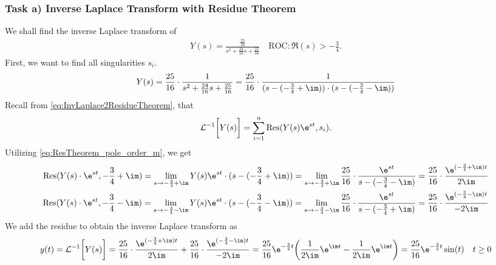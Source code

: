 \subsubsection{Task a) Inverse Laplace Transform with Residue Theorem}
We shall find the inverse Laplace transform of
\begin{align}
	Y(s)=\frac{\frac{25}{16}}{s^2+\frac{24}{16}s+\frac{25}{16}}
\quad \text{ROC}: \Re(s) > -\frac{3}{4}
	. \nonumber
\end{align}
First, we want to find all singularities $s_i$.
\begin{align}
	Y(s)=\frac{25}{16}\cdot\frac{1}{s^2+\frac{24}{16}s+\frac{25}{16}}=\frac{25}{16}\cdot \frac{1}{(s-(-\frac{3}{4}+\im))\cdot(s-(-\frac{3}{4}-\im))}
\end{align}
Recall from \eqref{eq:InvLaplace2ResidueTheorem}, that
\begin{align}
	\mathcal{L}^{-1}\bigg [Y(s)\bigg ] = \sum_{i=1}^{n}\mathrm{Res}(Y(s)\e^{st},s_i). \nonumber
\end{align}
Utilizing \eqref{eq:ResTheorem_pole_order_m}, we get
\begin{align}
	\mathrm{Res}(Y(s)\cdot\e^{st},-\frac{3}{4}+\im)=\lim\limits_{s\rightarrow-\frac{3}{4}+\im}Y(s)\e^{st}\cdot(s-(-\frac{3}{4}+\im))=\lim\limits_{s\rightarrow-\frac{3}{4}+\im}\frac{25}{16}\cdot\frac{\e^{st}}{s-(-\frac{3}{4}-\im)}=\frac{25}{16}\cdot\frac{\e^{(-\frac{3}{4}+\im) t}}{2\im} \nonumber \\
	\mathrm{Res}(Y(s)\cdot\e^{st},-\frac{3}{4}-\im)=\lim\limits_{s\rightarrow-\frac{3}{4}-\im}Y(s)\e^{st}\cdot(s-(-\frac{3}{4}-\im))=\lim\limits_{s\rightarrow-\frac{3}{4}-\im}\frac{25}{16}\cdot\frac{\e^{st}}{s-(-\frac{3}{4}+\im)}=\frac{25}{16}\cdot\frac{\e^{(-\frac{3}{4}-\im) t}}{-2\im}
\end{align}
We add the residue to obtain the inverse Laplace transform as
\begin{align}
	y(t)=\mathcal{L}^{-1}\bigg [ Y(s) \bigg ]= \frac{25}{16}\cdot\frac{\e^{(-\frac{3}{4}+\im)t}}{2\im}+\frac{25}{16}\cdot\frac{\e^{(-\frac{3}{4}-\im)t}}{-2\im} = \frac{25}{16}\e^{-\frac{3}{4}t}\bigg (\frac{1}{2\im}\e^{\im t}-\frac{1}{2\im}\e^{\im t} \bigg )=\frac{25}{16}\e^{-\frac{3}{4}t}\sin(t)\quad t\geq 0
\end{align}

